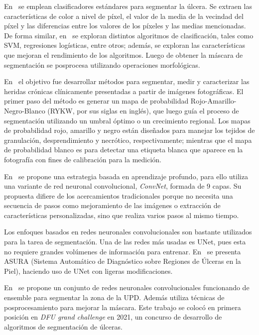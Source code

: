 En~\cite{seixas2015pattern} se emplean clasificadores estándares para segmentar la úlcera. Se extraen las características de color a nivel de píxel, el valor de la media de la vecindad del píxel y las diferencias entre los valores de los píxeles y las medias mencionadas. De forma similar, en~\cite{heras2022diabetic} se exploran distintos algoritmos de clasificación, tales como SVM, regresiones logísticas, entre otros; además, se exploran las características que mejoran el rendimiento de los algoritmos.  Luego de obtener la máscara de segmentación se posprocesa utilizando operaciones morfológicas.

En~\cite{malian2004medphos} el objetivo fue desarrollar métodos para segmentar, medir y caracterizar las heridas crónicas clínicamente presentadas a partir de imágenes fotográficas. El primer paso del método es generar un mapa de probabilidad Rojo-Amarillo-Negro-Blanco (RYKW, por sus siglas en inglés), que luego guía el proceso de segmentación utilizando un umbral óptimo o un crecimiento regional. Los mapas de probabilidad rojo, amarillo y negro están diseñados para manejar los tejidos de granulación, desprendimiento y necrótico, respectivamente; mientras que el mapa de probabilidad blanco es para detectar una etiqueta blanca que aparece en la fotografía con fines de calibración para la medición.

En~\cite{wang2015unified} se propone una estrategia basada en aprendizaje profundo, para ello utiliza una variante de red neuronal convolucional, \textit{ConvNet}, formada de 9 capas. Su propuesta difiere de los acercamientos tradicionales porque no necesita una secuencia de pasos como mejoramiento de las imágenes o extracción de características personalizadas, sino que realiza varios pasos al mismo tiempo.

Los enfoques basados en redes neuronales convolucionales son bastante utilizados para la tarea de segmentación. Una de las redes más usadas es UNet, pues esta no requiere grandes volúmenes de información para entrenar. En~\cite{chino2020segmenting} se presenta ASURA (Sistema Automático de Diagnóstico sobre Regiones de Úlceras en la Piel), haciendo uso de UNet con ligeras modificaciones.

En~\cite{mahbod2021automatic} se propone un conjunto de redes neuronales convolucionales funcionando de ensemble para segmentar la zona de la UPD. Además utiliza técnicas de posprocesamiento para mejorar la máscara. Este trabajo se colocó en primera posición en \textit{DFU grand challenge} en 2021, un concurso de desarrollo de algoritmos de segmentación de úlceras.

